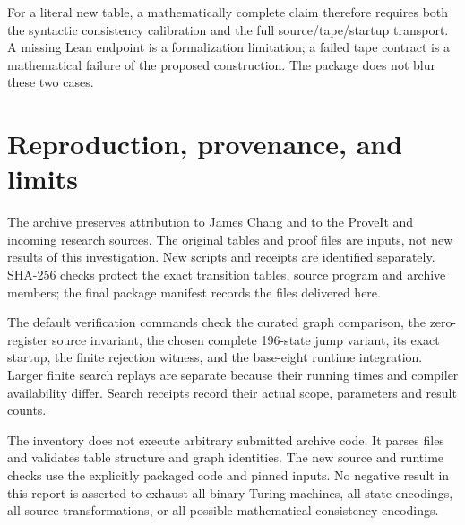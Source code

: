 \documentclass[11pt,a4paper]{article}
\begin{document}
For a literal new table, a mathematically complete claim therefore requires
both the syntactic consistency calibration and the full source/tape/startup
transport. A missing Lean endpoint is a formalization limitation; a failed
tape contract is a mathematical failure of the proposed construction.
The package does not blur these two cases.

\appendix


\section{Reproduction, provenance, and limits}

The archive preserves attribution to James Chang and to the ProveIt and
incoming research sources. The original tables and proof files are inputs,
not new results of this investigation. New scripts and receipts are
identified separately. SHA-256 checks protect the exact transition tables,
source program and archive members; the final package manifest records
the files delivered here.

The default verification commands check the curated graph comparison,
the zero-register source invariant, the chosen complete 196-state jump
variant, its exact startup, the finite rejection witness, and the base-eight
runtime integration. Larger finite search replays are separate because
their running times and compiler availability differ. Search receipts
record their actual scope, parameters and result counts.

The inventory does not execute arbitrary submitted archive code. It parses
files and validates table structure and graph identities. The new source
and runtime checks use the explicitly packaged code and pinned inputs.
No negative result in this report is asserted to exhaust all binary
Turing machines, all state encodings, all source transformations, or all
possible mathematical consistency encodings.
\end{document}
